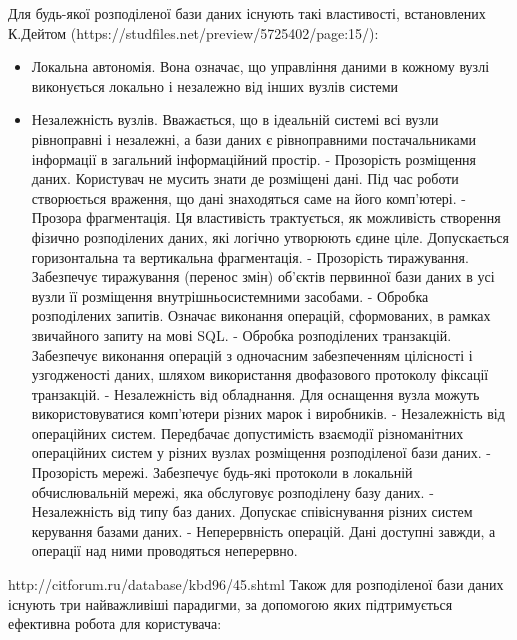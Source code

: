 \documentclass[14pt]{vakthesis}
\begin{document}
Для будь-якої розподіленої бази даних існують такі властивості, встановлених К.Дейтом (https://studfiles.net/preview/5725402/page:15/):
\begin{itemize}
 \item Локальна автономія. Вона означає, що управління даними в кожному вузлі виконується локально і незалежно від інших вузлів системи
 \item Незалежність вузлів. Вважається, що в ідеальній системі всі вузли рівноправні і незалежні, а бази даних є рівноправними постачальниками інформації в загальний інформаційний простір.
 - Прозорість розміщення даних. Користувач не мусить знати де розміщені дані. Під час роботи створюється враження, що дані знаходяться саме на його комп’ютері.
 - Прозора фрагментація. Ця властивість трактується, як можливість створення фізично розподілених даних, які логічно утворюють єдине ціле. Допускається горизонтальна та вертикальна фрагментація.
 - Прозорість тиражування. Забезпечує тиражування (перенос змін) об’єктів первинної бази даних в усі вузли її розміщення внутрішньосистемними засобами.
 - Обробка розподілених запитів. Означає виконання операцій, сформованих, в рамках звичайного запиту на мові SQL.
 - Обробка розподілених транзакцій. Забезпечує виконання операцій з одночасним забезпеченням цілісності і узгодженості даних, шляхом використання двофазового протоколу фіксації транзакцій.
 - Незалежність від обладнання. Для оснащення вузла можуть використовуватися комп’ютери різних марок і виробників.
 - Незалежність від операційних систем. Передбачає допустимість взаємодії різноманітних операційних систем у різних вузлах розміщення розподіленої бази даних.
 - Прозорість мережі. Забезпечує будь-які протоколи в локальній обчислювальній мережі, яка обслуговує розподілену базу даних.
 - Незалежність від типу баз даних. Допускає співіснування різних систем керування базами даних.
 - Неперервність операцій. Дані доступні завжди, а операції над ними проводяться неперервно.

\end{itemize} 
http://citforum.ru/database/kbd96/45.shtml
Також для розподіленої бази даних існують три найважливіші парадигми, за допомогою яких підтримується ефективна робота для користувача:
\end{document}
